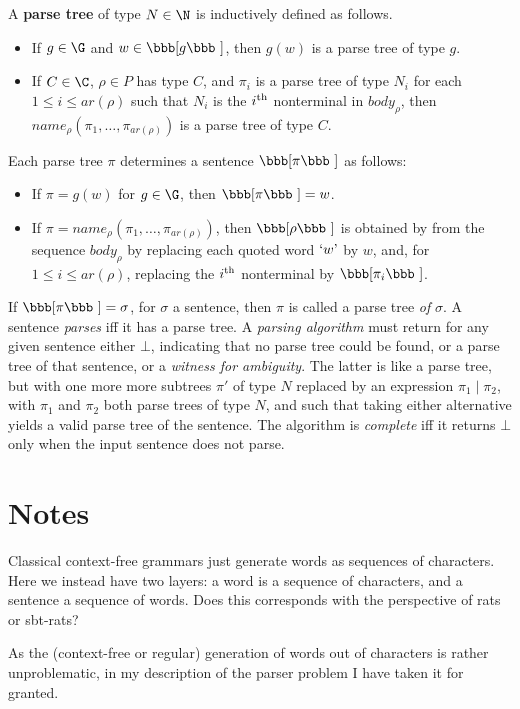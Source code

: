 \documentclass[adraft]{eptcs}
\newcommand{\denote}[1]{\mbox{\bbb [}#1\mbox{\bbb ]}}   %
\begin{document}
A \textbf{parse tree} of type $N\in \N$ is inductively defined as follows.
\begin{itemize}
\item If $g\in \G$ and $w\in \denote{g}$, then $g(w)$ is a parse tree of type $g$.
\item If $C\in \C$, $\rho\in P$ has type $C$, and $\pi_i$ is a parse tree of type $N_i$ for each
  $1\leq i \leq \textit{ar}(\rho)$ such that $N_i$ is the $i^{\rm th}$ nonterminal in $\textit{body}_\rho$,
  then $\textit{name}_\rho(\pi_1,\dots,\pi_{\textit{ar}(\rho)})$ is a parse tree of type $C$. 
\end{itemize}
Each parse tree $\pi$ determines a sentence $\denote{\pi}$ as follows:
\begin{itemize}
\item If $\pi = g(w)$ for $g\in\G$, then $\denote{\pi}=w$.
\item If $\pi = \textit{name}_\rho(\pi_1,\dots,\pi_{\textit{ar}(\rho)})$, then $\denote{\rho}$ is obtained by
  from the sequence $\textit{body}_\rho$ by replacing each quoted word $`w\mbox{'}$ by $w$, and, for
  $1\leq i \leq \textit{ar}(\rho)$, replacing the $i^{\rm th}$ nonterminal by $\denote{\pi_i}$.
\end{itemize}
If $\denote{\pi}=\sigma$, for $\sigma$ a sentence, then $\pi$ is called a parse tree \emph{of} $\sigma$.
A sentence \emph{parses} iff it has a parse tree.
A \emph{parsing algorithm} must return for any given sentence either $\bot$, indicating that no
parse tree could be found, or a parse tree of that sentence, or a \emph{witness for ambiguity}.
The latter is like a parse tree, but with one more more subtrees $\pi'$ of type $N$ replaced by an
expression $\pi_1 \mid \pi_2$, with $\pi_1$ and $\pi_2$ both parse trees of type $N$, and such that
taking either alternative yields a valid parse tree of the sentence.
The algorithm is \emph{complete} iff it returns $\bot$ only when the input sentence does
not parse.

\section{Notes}

Classical context-free grammars just generate words as sequences of characters.
Here we instead have two layers: a word is a sequence of characters, and a sentence a sequence of words.
Does this corresponds with the perspective of rats or sbt-rats?

As the (context-free or regular) generation of words out of characters is rather unproblematic, in
my description of the parser problem I have taken it for granted.
\end{document}
